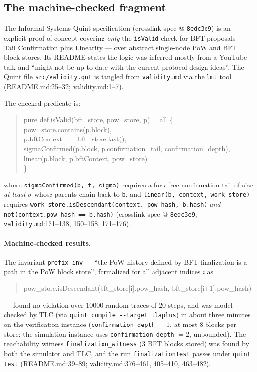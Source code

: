 \documentclass[11pt,a4paper]{article}
\theoremstyle{definition}
\begin{document}
\subsection{The machine-checked fragment}\label{sec:xl-quint}

The Informal Systems Quint specification (crosslink-spec @
\texttt{8edc3e9}) is an explicit proof of concept covering \emph{only}
the \texttt{isValid} check for BFT proposals --- Tail Confirmation plus
Linearity --- over abstract single-node PoW and BFT block stores. Its
README states the logic was inferred mostly from a YouTube talk and
``might not be up-to-date with the current protocol design ideas''. The
Quint file \texttt{src/validity.qnt} is tangled from
\texttt{validity.md} via the \texttt{lmt} tool (README.md:25--32;
validity.md:1--7).

The checked predicate is:
\begin{quote}\ttfamily\small
pure def isValid(bft\_store, pow\_store, p) = all \{\\
\hspace*{1.5em}pow\_store.contains(p.block),\\
\hspace*{1.5em}p.bftContext == bft\_store.last(),\\
\hspace*{1.5em}sigmaConfirmed(p.block, p.confirmation\_tail,
confirmation\_depth),\\
\hspace*{1.5em}linear(p.block, p.bftContext, pow\_store)\\
\}
\end{quote}
where \texttt{sigmaConfirmed(b, t, sigma)} requires a fork-free
confirmation tail of size \emph{at least} $\sigma$ whose parents chain
back to \texttt{b}, and \texttt{linear(b, context, work\_store)} requires
\texttt{work\_store.\allowbreak isDescendant(context.\allowbreak
pow\_hash, b.hash)} \emph{and}
\texttt{not(context.pow\_hash == b.hash)} (crosslink-spec @
\texttt{8edc3e9}, \texttt{validity.md}:131--138, 150--158, 171--176).

\paragraph{Machine-checked results.} The invariant \texttt{prefix\_inv}
--- ``the PoW history defined by BFT finalization is a path in the PoW
block store'', formalized for all adjacent indices $i$ as
\begin{quote}\ttfamily\small
pow\_store.isDescendant(bft\_store[i].pow\_hash,
bft\_store[i+1].pow\_hash)
\end{quote}
--- found no
violation over $10000$ random traces of $20$ steps, and was model checked
by TLC (via \texttt{quint compile -{}-target tlaplus}) in about three
minutes on the verification instance (\texttt{confirmation\_depth} $= 1$,
at most $8$ blocks per store; the simulation instance uses
\texttt{confirmation\_depth} $= 2$, unbounded). The reachability witness
\texttt{finalization\_witness} ($3$ BFT blocks stored) was found by both
the simulator and TLC, and the run \texttt{finalizationTest} passes under
\texttt{quint test} (README.md:39--89; validity.md:376--461, 405--410,
463--482).
\end{document}
